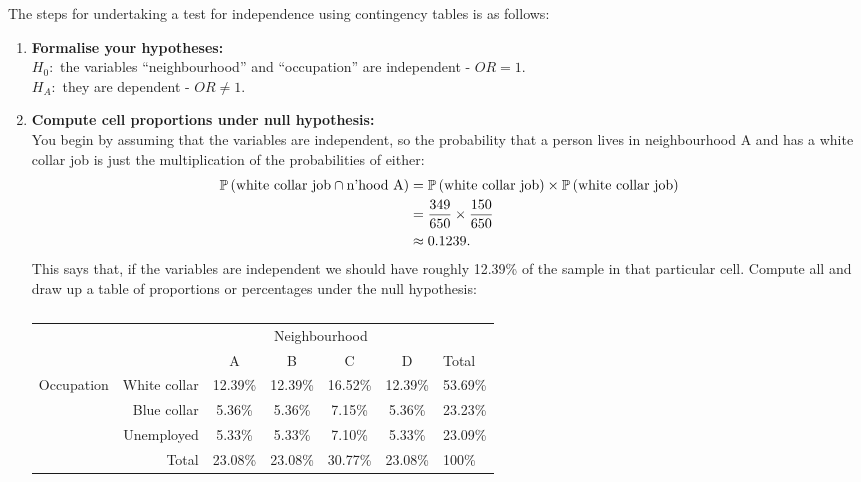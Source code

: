 The steps for undertaking a test for independence using contingency tables is as follows:
\begin{enumerate}
    \item \textbf{Formalise your hypotheses:} \\
    $H_0:$ the variables ``neighbourhood'' and ``occupation'' are independent - $OR=1$. \\
    $H_A:$ they are dependent - $OR\ne 1$.
    
    \item \textbf{Compute cell proportions under null hypothesis:} \\
    You begin by assuming that the variables are independent, so the probability that a person lives in neighbourhood A and has a white collar job is just the multiplication of the probabilities of either:
    \begin{align}
        \operatorname{\mathbb{P}}{\left( \text{white collar job} \cap \text{n'hood A}\right)} &= \operatorname{\mathbb{P}}{\left( \text{white collar job}\right)} \times \operatorname{\mathbb{P}}{\left( \text{white collar job}\right)} \\
        &= \frac{349}{650} \times \frac{150}{650} \\
        &\approx 0.1239.
    \end{align}
    This says that, if the variables are independent we should have roughly 12.39\% of the sample in that particular cell. Compute all and draw up a table of proportions or percentages under the null hypothesis:
    \begin{table}[h]
    \centering
    \begin{tabular}{rr|cccc|l}
        {} & {} & \multicolumn{4}{c|}{Neighbourhood} & {} \\
        {} & {} & A & B & C & D & Total \\ \hline
        \multicolumn{1}{r}{\multirow{3}{*}{Occupation}} & White collar & 12.39\% & 12.39\% & 16.52\% & 12.39\% & 53.69\% \\
        \multicolumn{1}{r}{} & Blue collar & 5.36\% & 5.36\% & 7.15\% & 5.36\% & 23.23\% \\
        \multicolumn{1}{r}{} & Unemployed & 5.33\% & 5.33\% & 7.10\% & 5.33\% & 23.09\% \\ \hline
        {} & Total & 23.08\% & 23.08\% & 30.77\% & 23.08\% & 100\%
    \end{tabular}
    \caption{}
    \label{tab:3wk6}
    \end{table}
    

\end{enumerate}
